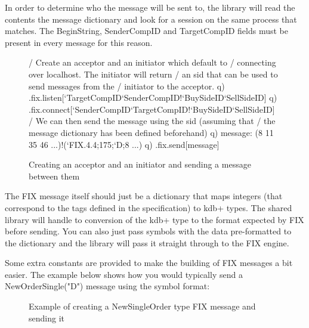 In order to determine who the message will be sent to, the library will read the contents
the message dictionary and look for a session on the same process that matches. The BeginString,
SenderCompID and TargetCompID fields must be present in every message for this reason.

\begin{figure}[H]
\begin{qcode}
/ Create an acceptor and an initiator which default to 
/ connecting over localhost. The initiator will return
/ an sid that can be used to send messages from the
/ initiator to the acceptor.
q) .fix.listen[`TargetCompID`SenderCompID!`BuySideID`SellSideID]
q) .fix.connect[`SenderCompID`TargetCompID!`BuySideID`SellSideID]
/ We can then send the message using the sid (assuming that
/ the message dictionary has been defined beforehand)
q) message: (8 11 35 46 ...)!(`FIX.4.4;175;`D;8 ...)
q) .fix.send[message]
\end{qcode}
\caption{Creating an acceptor and an initiator and sending a message between them}
\end{figure}

The FIX message itself should just be a dictionary that maps integers (that correspond to the tags defined in the specification) to kdb+ types. The shared library will handle to conversion of the kdb+ type to the format expected by FIX before sending. You can also just pass symbols with the data pre-formatted to the dictionary and the library will pass it straight through to the FIX engine.

Some extra constants are provided to make the building of FIX messages a bit easier. The example below shows how you would typically send a NewOrderSingle("D") message using the symbol format:

\begin{figure}[H]
\caption{Example of creating a NewSingleOrder type FIX message and sending it}
\end{figure}

